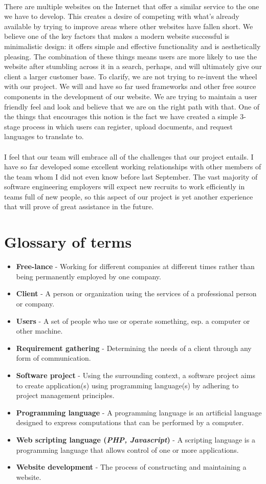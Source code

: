 \documentclass{article}
\begin{document}
\\
There are multiple websites on the Internet that offer a similar service to the one we have to develop. This creates a desire of competing with what's already available by trying to improve areas where other websites have fallen short. We believe one of the key factors that makes a modern website successful is minimalistic design: it offers simple and effective functionality and is aesthetically pleasing. The combination of these things means users are more likely to use the website after stumbling across it in a search, perhaps, and will ultimately give our client a larger customer base. To clarify, we are not trying to re-invent the wheel with our project. We will and have so far used frameworks and other free source components in the development of our website. We are trying to maintain a user friendly feel and look and believe that we are on the right path with that. One of the things that encourages this notion is the fact we have created a simple 3-stage process in which users can register, upload documents, and request languages to translate to.\\   
\\
I feel that our team will embrace all of the challenges that our project entails. I have so far developed some excellent working relationships with other members of the team whom I did not even know before last September. The vast majority of software engineering employers will expect new recruits to work efficiently in teams full of new people, so this aspect of our project is yet another experience that will prove of great assistance in the future.
\section{Glossary of terms}

\begin{itemize}
\item{\textbf{Free-lance} - Working for different companies at different times rather than being permanently employed by one company.} 
\item{\textbf{Client} - A person or organization using the services of a professional person or company.} 
\item{\textbf{Users} - A set of people who use or operate something, esp. a computer or other machine.}
\item{\textbf{Requirement gathering} - Determining the needs of a client through any form of communication.}
\item{\textbf{Software project} - Using the surrounding context, a software project aims to create application(s) using programming language(s) by adhering to project management principles.}
\item{\textbf{Programming language} - A programming language is an artificial language designed to express computations that can be performed by a computer.}
\item{\textbf{Web scripting language (\textit{PHP, Javascript})} - A scripting language is a programming language that allows control of one or more applications.}
\item{\textbf{Website development} - The process of constructing and maintaining a website.}
\end{itemize}
\end{document}
